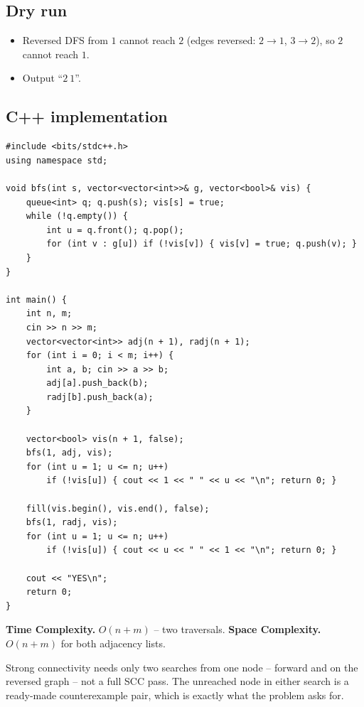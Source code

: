 \subsection*{Dry run}


\begin{itemize}
  \item Reversed DFS from $1$ cannot reach $2$ (edges reversed:
        $2\!\to\!1$, $3\!\to\!2$), so $2$ cannot reach $1$.
  \item Output ``$2\ 1$''.
\end{itemize}

\subsection*{C++ implementation}

\begin{lstlisting}
#include <bits/stdc++.h>
using namespace std;

void bfs(int s, vector<vector<int>>& g, vector<bool>& vis) {
    queue<int> q; q.push(s); vis[s] = true;
    while (!q.empty()) {
        int u = q.front(); q.pop();
        for (int v : g[u]) if (!vis[v]) { vis[v] = true; q.push(v); }
    }
}

int main() {
    int n, m;
    cin >> n >> m;
    vector<vector<int>> adj(n + 1), radj(n + 1);
    for (int i = 0; i < m; i++) {
        int a, b; cin >> a >> b;
        adj[a].push_back(b);
        radj[b].push_back(a);
    }

    vector<bool> vis(n + 1, false);
    bfs(1, adj, vis);
    for (int u = 1; u <= n; u++)
        if (!vis[u]) { cout << 1 << " " << u << "\n"; return 0; }

    fill(vis.begin(), vis.end(), false);
    bfs(1, radj, vis);
    for (int u = 1; u <= n; u++)
        if (!vis[u]) { cout << u << " " << 1 << "\n"; return 0; }

    cout << "YES\n";
    return 0;
}
\end{lstlisting}

\begin{complexitybox}
\textbf{Time Complexity.} $O(n+m)$ -- two traversals. \textbf{Space
Complexity.} $O(n+m)$ for both adjacency lists.
\end{complexitybox}

\begin{takeawaybox}
Strong connectivity needs only two searches from one node -- forward and on
the reversed graph -- not a full SCC pass. The unreached node in either
search is a ready-made counterexample pair, which is exactly what the
problem asks for.
\end{takeawaybox}
